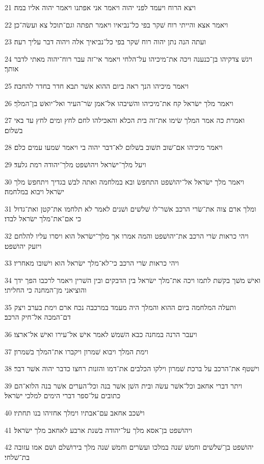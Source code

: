\par 21 ויצא הרוח ויעמד לפני יהוה ויאמר אני אפתנו ויאמר יהוה אליו במה׃
\par 22 ויאמר אצא והייתי רוח שׁקר בפי כל־נביאיו ויאמר תפתה וגם־תוכל צא ועשׂה־כן׃
\par 23 ועתה הנה נתן יהוה רוח שׁקר בפי כל־נביאיך אלה ויהוה דבר עליך רעה׃
\par 24 ויגשׁ צדקיהו בן־כנענה ויכה את־מיכיהו על־הלחי ויאמר אי־זה עבר רוח־יהוה מאתי לדבר אותך׃
\par 25 ויאמר מיכיהו הנך ראה ביום ההוא אשׁר תבא חדר בחדר להחבה׃
\par 26 ויאמר מלך ישׂראל קח את־מיכיהו והשׁיבהו אל־אמן שׂר־העיר ואל־יואשׁ בן־המלך׃
\par 27 ואמרת כה אמר המלך שׂימו את־זה בית הכלא והאכילהו לחם לחץ ומים לחץ עד באי בשׁלום׃
\par 28 ויאמר מיכיהו אם־שׁוב תשׁוב בשׁלום לא־דבר יהוה בי ויאמר שׁמעו עמים כלם׃
\par 29 ויעל מלך־ישׂראל ויהושׁפט מלך־יהודה רמת גלעד׃
\par 30 ויאמר מלך ישׂראל אל־יהושׁפט התחפשׂ ובא במלחמה ואתה לבשׁ בגדיך ויתחפשׂ מלך ישׂראל ויבוא במלחמה׃
\par 31 ומלך ארם צוה את־שׂרי הרכב אשׁר־לו שׁלשׁים ושׁנים לאמר לא תלחמו את־קטן ואת־גדול כי אם־את־מלך ישׂראל לבדו׃
\par 32 ויהי כראות שׂרי הרכב את־יהושׁפט והמה אמרו אך מלך־ישׂראל הוא ויסרו עליו להלחם ויזעק יהושׁפט׃
\par 33 ויהי כראות שׂרי הרכב כי־לא־מלך ישׂראל הוא וישׁובו מאחריו׃
\par 34 ואישׁ משׁך בקשׁת לתמו ויכה את־מלך ישׂראל בין הדבקים ובין השׁרין ויאמר לרכבו הפך ידך והוציאני מן־המחנה כי החליתי׃
\par 35 ותעלה המלחמה ביום ההוא והמלך היה מעמד במרכבה נכח ארם וימת בערב ויצק דם־המכה אל־חיק הרכב׃
\par 36 ויעבר הרנה במחנה כבא השׁמשׁ לאמר אישׁ אל־עירו ואישׁ אל־ארצו׃
\par 37 וימת המלך ויבוא שׁמרון ויקברו את־המלך בשׁמרון׃
\par 38 וישׁטף את־הרכב על ברכת שׁמרון וילקו הכלבים את־דמו והזנות רחצו כדבר יהוה אשׁר דבר׃
\par 39 ויתר דברי אחאב וכל־אשׁר עשׂה ובית השׁן אשׁר בנה וכל־הערים אשׁר בנה הלוא־הם כתובים על־ספר דברי הימים למלכי ישׂראל׃
\par 40 וישׁכב אחאב עם־אבתיו וימלך אחזיהו בנו תחתיו׃
\par 41 ויהושׁפט בן־אסא מלך על־יהודה בשׁנת ארבע לאחאב מלך ישׂראל׃
\par 42 יהושׁפט בן־שׁלשׁים וחמשׁ שׁנה במלכו ועשׂרים וחמשׁ שׁנה מלך בירושׁלם ושׁם אמו עזובה בת־שׁלחי׃
